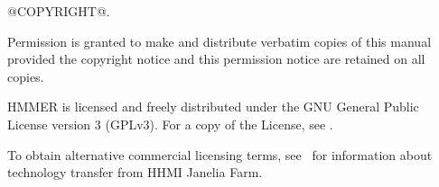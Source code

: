 \vspace*{\fill}
\begin{flushleft}
@COPYRIGHT@.\vspace{5mm}

\vspace{5mm}
Permission is granted to make and distribute verbatim copies of this
manual provided the copyright notice and this permission notice are
retained on all copies.\vspace{5mm}

\vspace{5mm} HMMER is licensed and freely distributed under the GNU
General Public License version 3 (GPLv3). For a copy of the License,
see .

\vspace{5mm}

To obtain alternative commercial licensing terms, see
\ for
information about technology transfer from HHMI Janelia Farm.

\vspace{5mm}
\end{flushleft}

